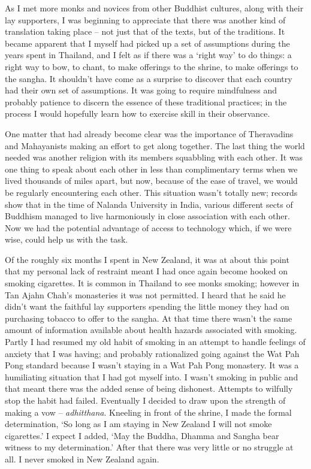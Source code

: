 As I met more monks and novices from other Buddhist cultures, along with
their lay supporters, I was beginning to appreciate that there was
another kind of translation taking place -- not just that of the texts,
but of the traditions. It became apparent that I myself had picked up a
set of assumptions during the years spent in Thailand, and I felt as if
there was a `right way' to do things: a right way to bow, to chant, to
make offerings to the shrine, to make offerings to the sangha. It
shouldn't have come as a surprise to discover that each country had
their own set of assumptions. It was going to require mindfulness and
probably patience to discern the essence of these traditional practices;
in the process I would hopefully learn how to exercise skill in their
observance.

One matter that had already become clear was the importance of
Theravadins and Mahayanists making an effort to get along together. The
last thing the world needed was another religion with its members
squabbling with each other. It was one thing to speak about each other
in less than complimentary terms when we lived thousands of miles apart,
but now, because of the ease of travel, we would be regularly
encountering each other. This situation wasn't totally new; records show
that in the time of Nalanda University in India, various different sects
of Buddhism managed to live harmoniously in close association with each
other. Now we had the potential advantage of access to technology which,
if we were wise, could help us with the task.

Of the roughly six months I spent in New Zealand, it was at about this
point that my personal lack of restraint meant I had once again become
hooked on smoking cigarettes. It is common in Thailand to see monks
smoking; however in Tan Ajahn Chah's monasteries it was not permitted. I
heard that he said he didn't want the faithful lay supporters spending
the little money they had on purchasing tobacco to offer to the sangha.
At that time there wasn't the same amount of information available about
health hazards associated with smoking. Partly I had resumed my old
habit of smoking in an attempt to handle feelings of anxiety that I was
having; and probably rationalized going against the Wat Pah Pong
standard because I wasn't staying in a Wat Pah Pong monastery. It was a
humiliating situation that I had got myself into. I wasn't smoking in
public and that meant there was the added sense of being dishonest.
Attempts to wilfully stop the habit had failed. Eventually I decided to
draw upon the strength of making a vow -- \emph{adhitthana}. Kneeling in
front of the shrine, I made the formal determination, `So long as I am
staying in New Zealand I will not smoke cigarettes.' I expect I added,
`May the Buddha, Dhamma and Sangha bear witness to my determination.'
After that there was very little or no struggle at all. I never smoked
in New Zealand again.

